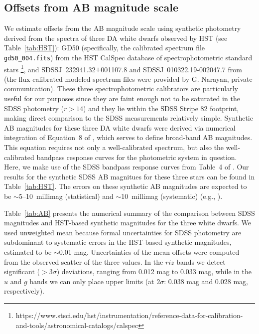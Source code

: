 \documentclass[fleqn,usenatbib]{mnras}
\begin{document}

\subsection{Offsets from AB magnitude scale \label{sec:AB}} 

We estimate offsets from the AB magnitude scale using synthetic photometry derived from the spectra of three DA white dwarfs observed by HST (see Table~\ref{tab:HST}): GD50 (specifically, the calibrated spectrum file {\tt gd50\_004.fits}) from the HST CalSpec database of spectrophotometric standard stars \citep{2014PASP..126..711B}\footnote{https://www.stsci.edu/hst/instrumentation/reference-data-for-calibration-and-tools/astronomical-catalogs/calspec}, and SDSSJ~232941.32$+$001107.8 and SDSSJ~010322.19-002047.7 from \citet{2019ApJS..241...20N}
(the flux-calibrated modeled spectrum files were provided by G. Narayan, private communication).  These three spectrophotometric calibrators are particularly useful for our purposes since they are faint enough not to be saturated in the SDSS photometry ($r>14$) and they lie within the SDSS Stripe 82 footprint, making direct comparison to the SDSS measurements relatively simple.  Synthetic AB magnitudes for these three DA white dwarfs were derived via numerical integration of Equation~8 of \citet{1996AJ....111.1748F}, which serves to define broad-band AB magnitudes.  This equation requires not only a well-calibrated spectrum, but also the well-calibrated bandpass response curves for the photometric system in question.  Here, we make use of the SDSS bandpass response curves from Table~4 of \citet{2010AJ....139.1628D}.  Our results for the synthetic SDSS AB magnitues for these three stars can be found in Table~\ref{tab:HST}.  The errors on these synthetic AB magnitudes are expected to be $\sim$5--10~millimag (statistical) and $\sim$10~millimag (systematic) (e.g., \citealt{2014PASP..126..711B}).  


Table~\ref{tab:AB} presents the numerical summary of the comparison between SDSS magnitudes 
and HST-based synthetic magnitudes for the three white dwarfs. We used unweighted mean because 
formal uncertainties for SDSS photometry are subdominant to systematic errors in the HST-based
synthetic magnitudes, estimated to be $\sim$0.01 mag. Uncertainties of the mean offsets were 
computed from the observed scatter of the three values. In the $riz$ bands we detect significant
($>3\sigma$) deviations, ranging from 0.012 mag to 0.033 mag, while in the $u$ and $g$ bands 
we can only place upper limits (at $2\sigma$: 0.038 mag and 0.028 mag, respectively). 
\end{document}
